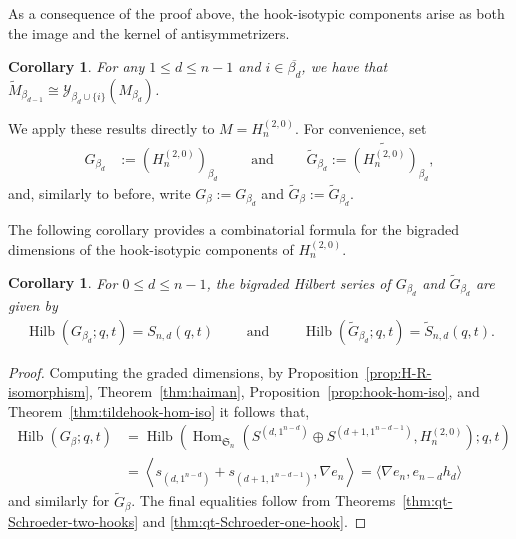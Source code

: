 \documentclass[11pt, noadjust, reqno]{amsart}
\newtheorem{corollary}[theorem]{Corollary}
\theoremstyle{definition}
\theoremstyle{remark}
\numberwithin{equation}{section}
\newcommand{\0}{\emptyset}
\newcommand{\cY}{\mathcal{Y}}
\DeclareMathOperator{\Hilb}{Hilb}
\DeclareMathOperator{\Hom}{Hom}
\begin{document}
As a consequence of the proof above, the hook-isotypic components arise as both the image and the kernel of antisymmetrizers.

\begin{corollary}
    For any $1\leq d \leq n-1$ and $i \in \overline{\beta_d}$, we have that $\widetilde{M}_{\beta_{d-1}} \cong \cY_{\beta_d \cup \{i\}}(M_{\beta_d})$.
\end{corollary}

We apply these results directly to $M=H_n^{(2,0)}$. For convenience, set
\begin{align*}
G_{\beta_d} &:=\left(  H_n^{(2,0)}\right)_{\beta_d}
\qquad \text{ and } \qquad \widetilde{G}_{\beta_d} := \widetilde{\left(  H_n^{(2,0)}\right)}_{\beta_d},
\end{align*}
and, similarly to before, write $G_\beta := G_{\beta_d}$ and $\widetilde{G}_\beta := \widetilde{G}_{\beta_d}$.

The following corollary provides a combinatorial formula for the bigraded dimensions of the hook-isotypic components of 
$H_n^{(2,0)}$.

\begin{corollary}\label{cor:schroeder-hook-dim}
    For $0\leq d \leq n-1$, the bigraded Hilbert series of $G_{\beta_d}$ and $\widetilde{G}_{\beta_d}$ are given by
    \begin{align*}
\Hilb(G_{\beta_d};q,t) = S_{n,d}(q,t) \qquad \text{ and } \qquad \Hilb(\widetilde{G}_{\beta_d};q,t) = \widetilde{S}_{n,d}(q,t).    
    \end{align*}
\end{corollary}

\begin{proof}
 Computing the graded dimensions, by Proposition~\ref{prop:H-R-isomorphism}, Theorem~\ref{thm:haiman}, Proposition~\ref{prop:hook-hom-iso}, and Theorem~\ref{thm:tildehook-hom-iso}
 it follows that, 
\begin{align*}
\Hilb(G_\beta;q,t) &= 
\Hilb\left(\Hom_{\mathfrak{S}_n} \left(S^{(d,1^{n-d})} \oplus S^{(d+1,1^{n-d-1})}, H_n^{(2,0)}\right);q,t\right) \\
& = \left\langle s_{(d,1^{n-d})} + s_{(d+1,1^{n-d-1})}, \nabla e_n\right\rangle 
=
\Big\langle \nabla e_n, e_{n-d}h_d \Big\rangle
\end{align*}
and similarly for $\widetilde{G}_\beta$. The final equalities follow from Theorems~\ref{thm:qt-Schroeder-two-hooks} and \ref{thm:qt-Schroeder-one-hook}.
\end{proof}
\end{document}
